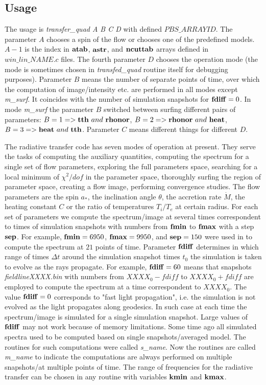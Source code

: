 \documentclass{emulateapj}
\begin{document}
\subsection{Usage}
The usage is \textit{transfer\_quad A B C D} with defined $PBS\_ARRAYID$.
The parameter $A$ chooses a spin of the flow or chooses one of the predefined models. $A-1$ is the index in ${\bf atab}$, ${\bf astr}$, and ${\bf ncuttab}$ arrays defined in
$\textit{win\_lin\_NAME.c}$ files. The fourth parameter $D$ chooses the operation mode (the mode is sometimes chosen in \textit{transfed\_quad} routine itself for debugging purposes).
Parameter $B$ means the number of separate points of time, over which the computation of image/intensity etc. are performed in all modes except \textit{m\_surf}.
It coincides with the number of simulation snapshots for ${\bf fdiff}=0$. In mode \textit{m\_surf} the parameter $B$ switched between surfing different pairs of parameters:
$B=1 => {\bf tth}~and~{\bf rhonor}$, $B=2 => {\bf rhonor}~and~{\bf heat}$, $B=3 => {\bf heat}~and~{\bf tth}$.
Parameter $C$ means different things for different $D$.

The radiative transfer code has seven modes of operation at present. They serve the tasks of computing the auxiliary quantities,
computing the spectrum for a single set of flow parameters, exploring the full parameters space, searching for a local minimum of $\chi^2/dof$ in the parameter space,
thoroughly surfing the region of parameter space, creating a flow image, performing convergence studies.
The flow parameters are the spin $a_*$, the inclination angle $\theta$, the accretion rate $\dot{M}$, the heating constant $C$ or the ratio of temperatures $T_i/T_e$ at certain radius.
For each set of parameters we compute the spectrum/image at several times correspondent to times of simulation snapshots with numbers from ${\bf fmin}$ to ${\bf fmax}$ with a step ${\bf sep}$.
For example, ${\bf fmin}=6950$, ${\bf fmax}=9950$, and ${\bf sep}=150$ were used in \citet{Shcherbakov:2012appl} to compute the spectrum at $21$ points of time.
Parameter ${\bf fdiff}$ determines in which range of times $\Delta t$ around the simulation snapshot times $t_0$ the simulation is taken to evolve as the rays propagate.
For example, ${\bf fdiff}=60$ means that snapshots \textit{fieldlineXXXX.bin} with numbers from $XXXX_0-fdiff$ to $XXXX_0+fdiff$ are employed to compute the spectrum at
a time correspondent to $XXXX_0$. The value ${\bf fdiff}=0$ corresponds to "fast light propagation", i.e. the simulation is not evolved as the light propagates along geodesics.
In such case at each time the spectrum/image is simulated for a single simulation snapshot. Large values of ${\bf fdiff}$ may not work because of memory limitations.
Some time ago all simulated spectra used to be computed based on single snapshots/averaged model.
The routines for such computations were called \textit{s\_name}. Now the routines are called \textit{m\_name} to indicate
the computations are always performed on multiple snapshots/at multiple points of time.
The range of frequencies for the radiative transfer can be chosen in any routine with variables ${\bf kmin}$ and ${\bf kmax}$.
\end{document}
